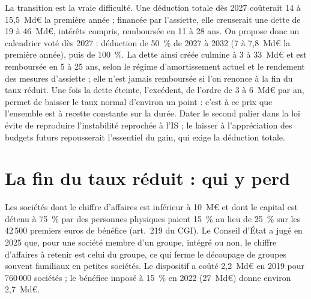 \documentclass[11pt,a4paper]{article}
\begin{document}
La transition est la vraie difficulté. Une déduction totale dès 2027 coûterait 14 à 15,5~Md€ la première
année ; financée par l'assiette, elle creuserait une dette de 19 à 46~Md€, intérêts compris, remboursée en 11
à 28 ans. On propose donc un calendrier voté dès 2027 : déduction de 50~\% de 2027 à 2032 (7 à 7,8~Md€ la
première année), puis de 100~\%. La dette ainsi créée culmine à 3 à 33~Md€ et est remboursée en 5 à 25 ans,
selon le régime d'amortissement actuel et le rendement des mesures d'assiette ; elle n'est jamais
remboursée si l'on renonce à la fin du taux réduit. Une fois la dette éteinte, l'excédent, de l'ordre de 3 à
6~Md€ par an, permet de baisser le taux normal d'environ un point : c'est à ce prix que l'ensemble est à
recette constante sur la durée. Dater le second palier dans la loi évite de reproduire l'instabilité
reprochée à l'IS ; le laisser à l'appréciation des budgets futurs repousserait l'essentiel du gain, qui
exige la déduction totale.

\section{La fin du taux réduit : qui y perd}

Les sociétés dont le chiffre d'affaires est inférieur à 10~M€ et dont le capital est détenu à 75~\% par des
personnes physiques paient 15~\% au lieu de 25~\% sur les 42\,500 premiers euros de bénéfice (art.~219 du
CGI). Le Conseil d'État a jugé en 2025 que, pour une société membre d'un groupe, intégré ou non, le chiffre
d'affaires à retenir est celui du groupe, ce qui ferme le découpage de groupes souvent familiaux en petites
sociétés. Le dispositif a coûté 2,2~Md€ en 2019 pour 760\,000 sociétés ; le
bénéfice imposé à 15~\% en 2022 (27~Md€) donne environ 2,7~Md€.
\end{document}
